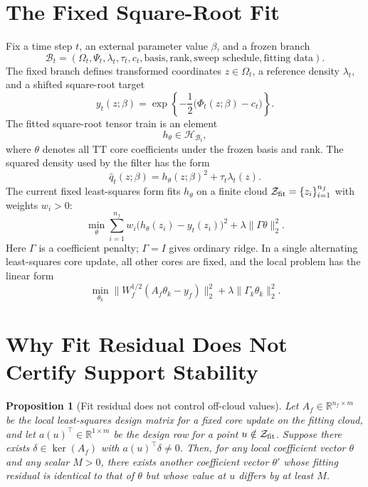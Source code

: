 \documentclass[11pt]{article}
\newtheorem{proposition}{Proposition}
\newcommand{\R}{\mathbb R}
\newcommand{\calZ}{\mathcal Z}
\newcommand{\calH}{\mathcal H}
\newcommand{\calB}{\mathcal B}
\begin{document}
\section{The Fixed Square-Root Fit}

Fix a time step \(t\), an external parameter value \(\beta\), and a frozen
branch
\[
    \calB_t
    =
    (\Omega_t,\Psi_t,\lambda_t,\tau_t,c_t,
      \text{basis},\text{rank},\text{sweep schedule},\text{fitting data}).
\]
The fixed branch defines transformed coordinates \(z\in\Omega_t\), a
reference density \(\lambda_t\), and a shifted square-root target
\begin{equation}
    y_t(z;\beta)
    =
    \exp\!\left\{-\frac{1}{2}
    \bigl(\Phi_t(z;\beta)-c_t\bigr)\right\}.
    \label{eq:p72-target}
\end{equation}
The fitted square-root tensor train is an element
\[
    h_\theta \in \calH_{\calB_t},
\]
where \(\theta\) denotes all TT core coefficients under the frozen basis and
rank.  The squared density used by the filter has the form
\begin{equation}
    \widehat q_t(z;\beta)
    =
    h_\theta(z;\beta)^2+\tau_t\lambda_t(z).
    \label{eq:p72-squared-density}
\end{equation}
The current fixed least-squares form fits \(h_\theta\) on a finite cloud
\(\calZ_{\rm fit}=\{z_i\}_{i=1}^{n_f}\) with weights \(w_i>0\):
\begin{equation}
    \min_\theta
    \sum_{i=1}^{n_f} w_i
    \bigl(h_\theta(z_i)-y_t(z_i)\bigr)^2
    +
    \lambda\|\Gamma\theta\|_2^2 .
    \label{eq:p72-current-objective}
\end{equation}
Here \(\Gamma\) is a coefficient penalty; \(\Gamma=I\) gives ordinary ridge.
In a single alternating least-squares core update, all other cores are fixed,
and the local problem has the linear form
\begin{equation}
    \min_{\theta_k}
    \|W_f^{1/2}(A_f\theta_k-y_f)\|_2^2
    +
    \lambda\|\Gamma_k\theta_k\|_2^2 .
    \label{eq:p72-local-ls}
\end{equation}

\section{Why Fit Residual Does Not Certify Support Stability}

\begin{proposition}[Fit residual does not control off-cloud values]
\label{prop:p72-fit-not-support}
Let \(A_f\in\R^{n_f\times m}\) be the local least-squares design matrix for a
fixed core update on the fitting cloud, and let \(a(u)^\top\in\R^{1\times m}\)
be the design row for a point \(u\notin\calZ_{\rm fit}\).  Suppose there exists
\(\delta\in\ker(A_f)\) with \(a(u)^\top\delta\ne0\).  Then, for any local
coefficient vector \(\theta\) and any scalar \(M>0\), there exists another
coefficient vector \(\theta'\) whose fitting residual is identical to that of
\(\theta\) but whose value at \(u\) differs by at least \(M\).
\end{proposition}
\end{document}
